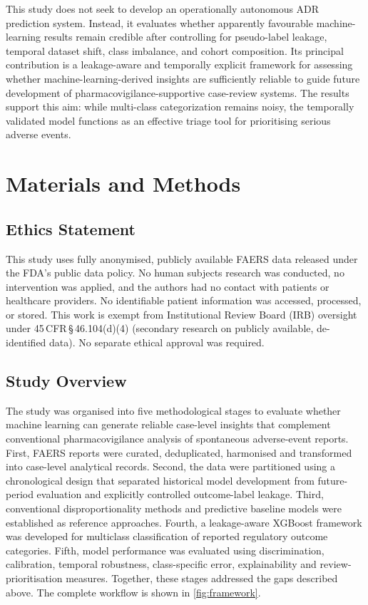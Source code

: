\documentclass[10pt]{article}
\begin{document}
This study does not seek to develop an operationally autonomous ADR prediction system. Instead, it evaluates whether apparently favourable machine-learning results remain credible after controlling for pseudo-label leakage, temporal dataset shift, class imbalance, and cohort composition. Its principal contribution is a leakage-aware and temporally explicit framework for assessing whether machine-learning-derived insights are sufficiently reliable to guide future development of pharmacovigilance-supportive case-review systems. The results support this aim: while multi-class categorization remains noisy, the temporally validated model functions as an effective triage tool for prioritising serious adverse events.

\section{Materials and Methods}

\subsection{Ethics Statement}
This study uses fully anonymised, publicly available FAERS data released under the FDA's public data policy. No human subjects research was conducted, no intervention was applied, and the authors had no contact with patients or healthcare providers. No identifiable patient information was accessed, processed, or stored. This work is exempt from Institutional Review Board (IRB) oversight under 45\,CFR\,\S\,46.104(d)(4) (secondary research on publicly available, de-identified data). No separate ethical approval was required.

\subsection{Study Overview}
The study was organised into five methodological stages to evaluate whether machine learning can generate reliable case-level insights that complement conventional pharmacovigilance analysis of spontaneous adverse-event reports. First, FAERS reports were curated, deduplicated, harmonised and transformed into case-level analytical records. Second, the data were partitioned using a chronological design that separated historical model development from future-period evaluation and explicitly controlled outcome-label leakage. Third, conventional disproportionality methods and predictive baseline models were established as reference approaches. Fourth, a leakage-aware XGBoost framework was developed for multiclass classification of reported regulatory outcome categories. Fifth, model performance was evaluated using discrimination, calibration, temporal robustness, class-specific error, explainability and review-prioritisation measures. Together, these stages addressed the gaps described above. The complete workflow is shown in \cref{fig:framework}.
\end{document}
